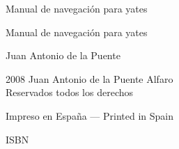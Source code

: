 \vspace*{\fill}
\begin{center}
\Huge Manual de navegación para yates
\end{center}
\vspace*{\fill}
\cleardoublepage

\vspace*{\fill}
\begin{center}
\Huge Manual de navegación para yates
\end{center}
\begin{center}
\LARGE\textsf{Juan Antonio de la Puente}\par
\end{center}
\vspace*{\fill}
\clearpage

\begingroup
\footnotesize
\setlength{\parindent}{0pt}
\setlength{\parskip}{\baselineskip}

\textcopyright{} 2008 Juan Antonio de la Puente Alfaro\\
Reservados todos los derechos

Impreso en España --- Printed in Spain

ISBN

\endgroup
\clearpage